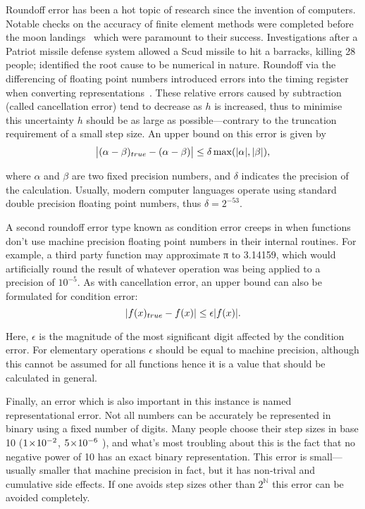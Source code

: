 Roundoff error has been a hot topic of research since the invention of computers.
Notable checks on the accuracy of finite element methods were completed before the moon landings~\cite{Cyrus1968} which were paramount to their success.
Investigations after a Patriot missile defense system allowed a Scud missile to hit a barracks, killing 28 people; identified the root cause to be numerical in nature.
Roundoff via the differencing of floating point numbers introduced errors into the timing register when converting representations~\cite{Skeel1992}.
These relative errors caused by subtraction (called cancellation error) tend to decrease as $h$ is increased, thus to minimise this uncertainty $h$ should be as large as possible---contrary to the truncation requirement of a small step size.
An upper bound on this error is given by
\begin{equation}
 \abs[\big]{(\alpha-\beta)_{true} - (\alpha-\beta)} \leq \delta \max(\abs{\alpha},\abs{\beta}),
\end{equation}

where $\alpha$ and $\beta$ are two fixed precision numbers, and $\delta$ indicates the precision of the calculation.
Usually, modern computer languages operate using standard double precision floating point numbers, thus $\delta = 2^{-53}$.

A second roundoff error type known as condition error creeps in when functions don't use machine precision floating point numbers in their internal routines.
For example, a third party function may approximate π to 3.14159, which would artificially round the result of whatever operation was being applied to a precision of $10^{-5}$.
As with cancellation error, an upper bound can also be formulated for condition error:
\begin{equation}
\abs{f(x)_{true} - f(x)}\leq \epsilon \abs{f(x)}.
\end{equation}

Here, $\epsilon$ is the magnitude of the most significant digit affected by the condition error.
For elementary operations $\epsilon$ should be equal to machine precision, although this cannot be assumed for all functions hence it is a value that should be calculated in general.

Finally, an error which is also important in this instance is named representational error.
Not all numbers can be accurately be represented in binary using a fixed number of digits.
Many people choose their step sizes in base 10 (\eg $1\ten{-2}$, $5\ten{-6}$ \etc), and what's most troubling about this is the fact that no negative power of 10 has an exact binary representation.
This error is small---usually smaller that machine precision in fact, but it has non-trival and cumulative side effects.
If one avoids step sizes other than $2^\mathbb{N}$ this error can be avoided completely.

